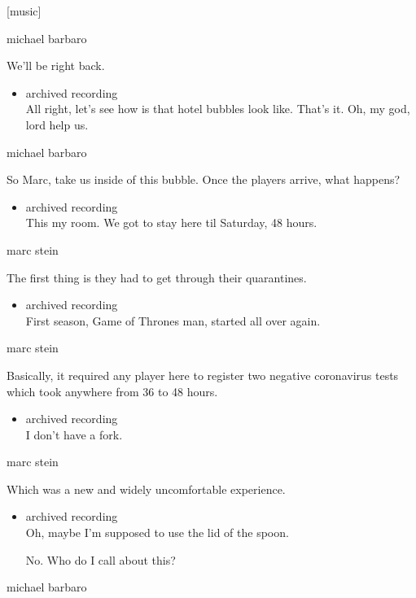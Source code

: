 {[}music{]}

michael barbaro

We'll be right back.

\begin{itemize}
\tightlist
\item
  archived recording\\
  All right, let's see how is that hotel bubbles look like. That's it.
  Oh, my god, lord help us.
\end{itemize}

michael barbaro

So Marc, take us inside of this bubble. Once the players arrive, what
happens?

\begin{itemize}
\tightlist
\item
  archived recording\\
  This my room. We got to stay here til Saturday, 48 hours.
\end{itemize}

marc stein

The first thing is they had to get through their quarantines.

\begin{itemize}
\tightlist
\item
  archived recording\\
  First season, Game of Thrones man, started all over again.
\end{itemize}

marc stein

Basically, it required any player here to register two negative
coronavirus tests which took anywhere from 36 to 48 hours.

\begin{itemize}
\tightlist
\item
  archived recording\\
  I don't have a fork.
\end{itemize}

marc stein

Which was a new and widely uncomfortable experience.

\begin{itemize}
\item
  archived recording\\
  Oh, maybe I'm supposed to use the lid of the spoon.

  No. Who do I call about this?
\end{itemize}

michael barbaro

